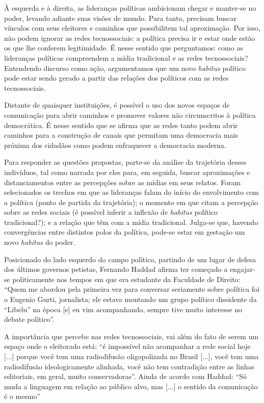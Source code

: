 À esquerda e à direita, as lideranças políticas ambicionam chegar e
manter-se no poder, levando adiante suas visões de mundo. Para tanto,
precisam buscar vínculos com seus eleitores e caminhos que possibilitem
tal aproximação. Por isso, não podem ignorar as redes tecnossociais: a
política precisa ir e estar onde estão os que lhe conferem legitimidade.
É nesse sentido que perguntamos: como as lideranças políticas
compreendem a mídia tradicional e as redes tecnossociais? Entendendo
discurso como ação, argumentamos que um novo \emph{habitus} político
pode estar sendo gerado a partir das relações dos políticos com as redes
tecnossociais.

Distante de quaisquer instituições, é possível o uso dos novos espaços
de comunicação para abrir caminhos e promover valores não circunscritos
à política democrática. É nesse sentido que se afirma que as redes tanto
podem abrir caminhos para a construção de canais que permitam uma
democracia mais próxima dos cidadãos como podem enfraquecer a democracia
moderna.

Para responder as questões propostas, parte-se da análise da trajetória
desses indivíduos, tal como narrada por eles para, em seguida, buscar
aproximações e distanciamentos entre as percepções sobre as mídias em
seus relatos. Foram selecionados os trechos em que as lideranças falam
do início do envolvimento com a política (ponto de partida da
trajetória); o momento em que citam a percepção sobre as redes sociais
(é possível inferir a inflexão de \emph{habitus} político tradicional?);
e a relação que têm com a mídia tradicional. Julga-se que, havendo
convergências entre distintos polos da política, pode-se estar em
gestação um novo \emph{habitus} do poder.

Posicionado do lado esquerdo do campo político, partindo de um lugar de
defesa dos últimos governos petistas, Fernando Haddad afirma ter
começado a engajar-se politicamente nos tempos em que era estudante da
Faculdade de Direito: ``Quem me abordou pela primeira vez para conversar
seriamente sobre política foi o Eugenio Gurti, jornalista; ele estava
montando um grupo político dissidente da ``Libelu'' na época {[}e{]} eu
vim acompanhando, sempre tive muito interesse no debate político''.

A importância que percebe nas redes tecnossociais, vai além do fato de
serem um espaço onde o eleitorado está: ``é impossível não acompanhar a
rede social hoje {[}...{]} porque você tem uma radiodifusão
oligopolizada no Brasil {[}...{]}, você tem uma radiodifusão
ideologicamente alinhada, você não tem contradição entre as linhas
editoriais, em geral, muito conservadoras''. Ainda de acordo com Haddad:
``Só muda a linguagem em relação ao público alvo, mas {[}...{]} o
sentido da comunicação é o mesmo''

